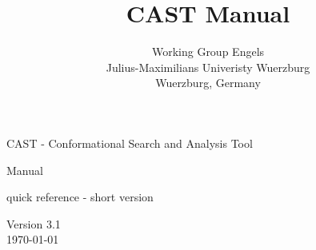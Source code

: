 \documentclass[10pt,a4paper]{article} %
\title{CAST Manual}
\author{Working Group Engels \\
	Julius-Maximilians Univeristy Wuerzburg \\
	Wuerzburg, Germany}
\newif\ifverbose %
\newif\ifdevelopment %
\newif\ifdevmode %
\begin{document}


	CAST - Conformational Search and Analysis Tool

	\ifdevelopment
		Manual for developers and programmers
	\else
		Manual
	\fi

	\ifverbose\else
		quick reference - short version
	\fi

	\ifdevmode
		\colorbox{red}{DEV MODE! THIS MANUAL IS NOT DESTINED TO BE RELEASED!}
	\fi

	Version 3.1 \\
	\today

	\ifdevmode
	\colorbox{red}{WE SHOULD REALLY PUT THE CAST ICON HERE!}
	\fi


	\newpage
	\tableofcontents


	\newpage
	\listoffigures

	\newpage

\end{document}
